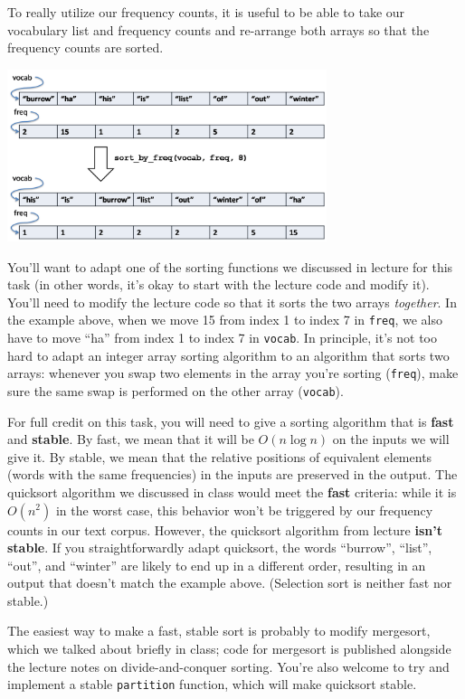 \documentclass[12pt]{exam}
\begin{document}
To really utilize our frequency counts, it is useful to be able to
take our vocabulary list and frequency counts and re-arrange both
arrays so that the frequency counts are sorted.
\begin{center}
\includegraphics[width=0.7\textwidth]{img/array-resort.png}
\end{center}
You'll want to adapt one of the sorting functions we discussed in
lecture for this task (in other words, it's okay to start with the
lecture code and modify it). You'll need to modify the lecture code so
that it sorts the two arrays \emph{together}. In the example above,
when we move 15 from index 1 to index 7 in \lstinline'freq', we also have
to move ``ha'' from index 1 to index 7 in \lstinline'vocab'.
In principle, it's not too hard to adapt
an integer array sorting algorithm to an algorithm that sorts two
arrays: whenever you swap two elements in the array you're sorting
(\lstinline'freq'), make sure the same swap is performed on the other array
(\lstinline'vocab').

For full credit on this task, you will need to give a sorting
algorithm that is \textbf{fast} and \textbf{stable}. By fast, we mean
that it will be $O(n \log n)$ on the inputs we will give it. By
stable, we mean that the relative positions of equivalent elements
(words with the same frequencies) in the inputs are preserved in the
output. The quicksort algorithm we discussed in class would meet the
\textbf{fast} criteria: while it is $O(n^2)$ in the worst case, this
behavior won't be triggered by our frequency counts in our text
corpus.  However, the quicksort algorithm from lecture \textbf{isn't
  stable}. If you straightforwardly adapt quicksort, the words
``burrow'', ``list'', ``out'', and ``winter'' are likely to end up in
a different order, resulting in an output that doesn't match the
example above. (Selection sort is neither fast nor stable.)

The easiest way to make a fast, stable sort is probably to modify
mergesort, which we talked about briefly in class; code for mergesort
is published alongside the lecture notes on
divide-and-conquer sorting.  You're also welcome to try and implement
a stable \lstinline'partition' function, which will make quicksort stable.
\end{document}
